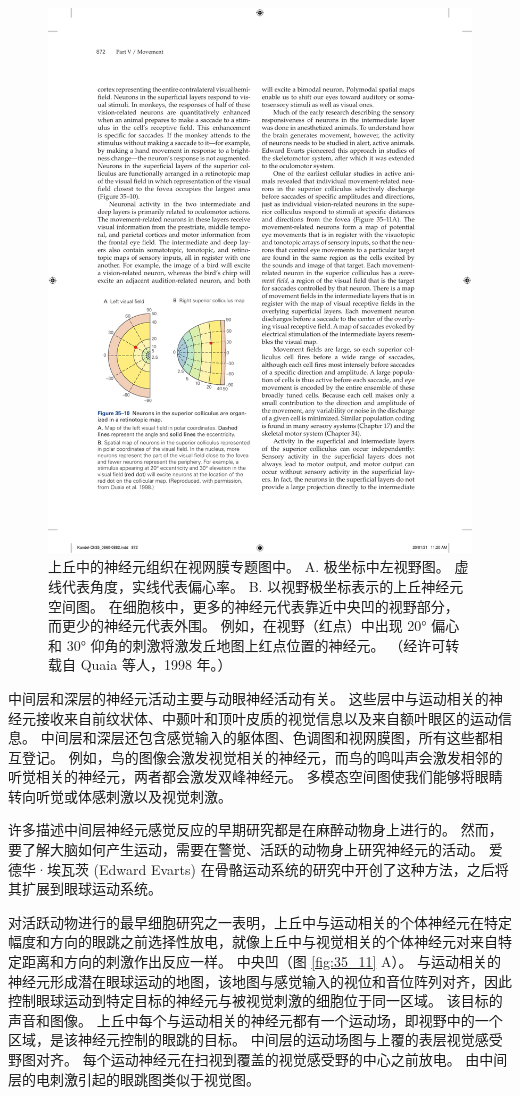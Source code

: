 \begin{figure}[htbp]
	\centering
	\includegraphics[width=0.5\linewidth]{chap35/fig_35_10}
	\caption{上丘中的神经元组织在视网膜专题图中。 A. 极坐标中左视野图。 虚线代表角度，实线代表偏心率。 B. 以视野极坐标表示的上丘神经元空间图。 在细胞核中，更多的神经元代表靠近中央凹的视野部分，而更少的神经元代表外围。 例如，在视野（红点）中出现 20° 偏心和 30° 仰角的刺激将激发丘地图上红点位置的神经元。 （经许可转载自 Quaia 等人，1998 年。）}
	\label{fig:35_10}
\end{figure}

中间层和深层的神经元活动主要与动眼神经活动有关。 这些层中与运动相关的神经元接收来自前纹状体、中颞叶和顶叶皮质的视觉信息以及来自额叶眼区的运动信息。 中间层和深层还包含感觉输入的躯体图、色调图和视网膜图，所有这些都相互登记。 例如，鸟的图像会激发视觉相关的神经元，而鸟的鸣叫声会激发相邻的听觉相关的神经元，两者都会激发双峰神经元。 多模态空间图使我们能够将眼睛转向听觉或体感刺激以及视觉刺激。

许多描述中间层神经元感觉反应的早期研究都是在麻醉动物身上进行的。 然而，要了解大脑如何产生运动，需要在警觉、活跃的动物身上研究神经元的活动。 爱德华·埃瓦茨 (Edward Evarts) 在骨骼运动系统的研究中开创了这种方法，之后将其扩展到眼球运动系统。

对活跃动物进行的最早细胞研究之一表明，上丘中与运动相关的个体神经元在特定幅度和方向的眼跳之前选择性放电，就像上丘中与视觉相关的个体神经元对来自特定距离和方向的刺激作出反应一样。 中央凹（图 \ref{fig:35_11} A）。 
与运动相关的神经元形成潜在眼球运动的地图，该地图与感觉输入的视位和音位阵列对齐，因此控制眼球运动到特定目标的神经元与被视觉刺激的细胞位于同一区域。 该目标的声音和图像。 上丘中每个与运动相关的神经元都有一个运动场，即视野中的一个区域，是该神经元控制的眼跳的目标。 中间层的运动场图与上覆的表层视觉感受野图对齐。 每个运动神经元在扫视到覆盖的视觉感受野的中心之前放电。 由中间层的电刺激引起的眼跳图类似于视觉图。

